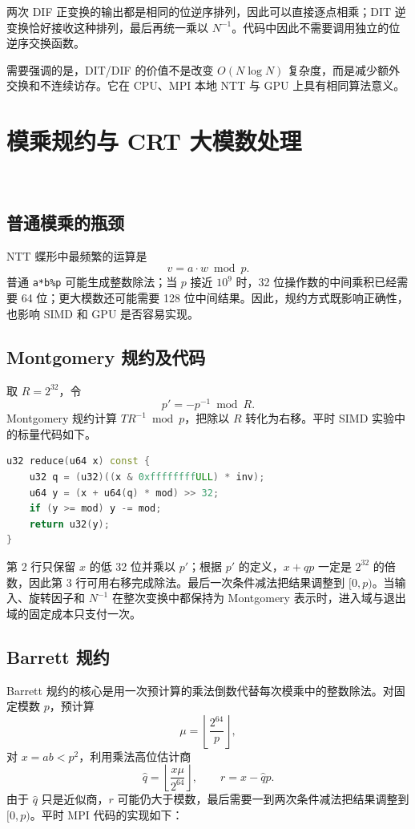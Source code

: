 两次 DIF 正变换的输出都是相同的位逆序排列，因此可以直接逐点相乘；DIT 逆变换恰好接收这种排列，最后再统一乘以 $N^{-1}$。代码中因此不需要调用独立的位逆序交换函数。

需要强调的是，DIT/DIF 的价值不是改变 $O(N\log N)$ 复杂度，而是减少额外交换和不连续访存。它在 CPU、MPI 本地 NTT 与 GPU 上具有相同算法意义。

\section{模乘规约与 CRT 大模数处理}\oldwork\ \fusionwork

\subsection{普通模乘的瓶颈}

NTT 蝶形中最频繁的运算是
\[
v=a\cdot w\bmod p.
\]
普通 \texttt{a*b\%p} 可能生成整数除法；当 $p$ 接近 $10^9$ 时，32 位操作数的中间乘积已经需要 64 位；更大模数还可能需要 128 位中间结果。因此，规约方式既影响正确性，也影响 SIMD 和 GPU 是否容易实现。

\subsection{Montgomery 规约及代码}

取 $R=2^{32}$，令
\[
p'=-p^{-1}\bmod R.
\]
Montgomery 规约计算 $TR^{-1}\bmod p$，把除以 $R$ 转化为右移。平时 SIMD 实验中的标量代码如下。

\begin{lstlisting}[title=32位 Montgomery 规约,label={lst:mont-reduce},language={C++}]
u32 reduce(u64 x) const {
    u32 q = (u32)((x & 0xffffffffULL) * inv);
    u64 y = (x + u64(q) * mod) >> 32;
    if (y >= mod) y -= mod;
    return u32(y);
}
\end{lstlisting}

第 2 行只保留 $x$ 的低 32 位并乘以 $p'$；根据 $p'$ 的定义，$x+qp$ 一定是 $2^{32}$ 的倍数，因此第 3 行可用右移完成除法。最后一次条件减法把结果调整到 $[0,p)$。当输入、旋转因子和 $N^{-1}$ 在整次变换中都保持为 Montgomery 表示时，进入域与退出域的固定成本只支付一次。

\subsection{Barrett 规约}

Barrett 规约的核心是用一次预计算的乘法倒数代替每次模乘中的整数除法。对固定模数 $p$，预计算
\[
\mu=\left\lfloor\frac{2^{64}}p\right\rfloor,
\]
对 $x=ab<p^2$，利用乘法高位估计商
\[
\widehat q=\left\lfloor\frac{x\mu}{2^{64}}\right\rfloor,
\qquad r=x-\widehat q p.
\]
由于 $\widehat q$ 只是近似商，$r$ 可能仍大于模数，最后需要一到两次条件减法把结果调整到 $[0,p)$。平时 MPI 代码的实现如下：

